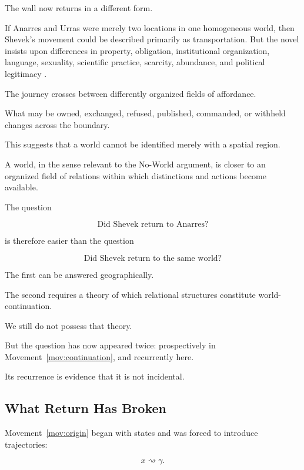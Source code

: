 \documentclass[
  11pt,
  a4paper,
  DIV=12,
  BCOR=0mm,
  parskip=half-
]{scrartcl}
\theoremstyle{definition}
\theoremstyle{plain}
\theoremstyle{remark}
\begin{document}
The wall now returns in a different form.

If Anarres and Urras were merely two locations in one homogeneous world, then
Shevek's movement could be described primarily as transportation. But the
novel insists upon differences in property, obligation, institutional
organization, language, sexuality, scientific practice, scarcity, abundance,
and political legitimacy \cite{leguin1974}.

The journey crosses between differently organized fields of affordance.

What may be owned, exchanged, refused, published, commanded, or withheld
changes across the boundary.

This suggests that a world cannot be identified merely with a spatial region.

A world, in the sense relevant to the No-World argument, is closer to an
organized field of relations within which distinctions and actions become
available.

The question

\[
  \text{Did Shevek return to Anarres?}
\]

is therefore easier than the question

\[
  \text{Did Shevek return to the same world?}
\]

The first can be answered geographically.

The second requires a theory of which relational structures constitute
world-continuation.

We still do not possess that theory.

But the question has now appeared twice: prospectively in
Movement~\ref{mov:continuation}, and recurrently here.

Its recurrence is evidence that it is not incidental.


\subsection{What Return Has Broken}
\label{sec:return-forced}

Movement~\ref{mov:origin} began with states and was forced to introduce
trajectories:

\[
  x
  \rightsquigarrow
  \gamma.
\]
\end{document}
